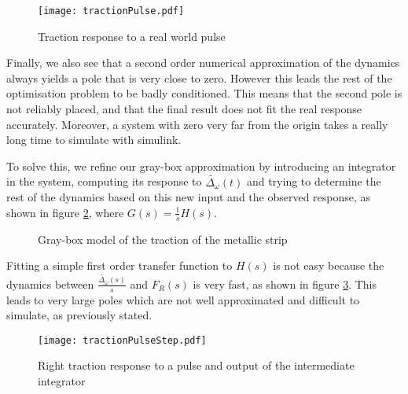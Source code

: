 \begin{figure}[htbp]
\centering
\texttt{[image: tractionPulse.pdf]}
\caption{Traction response to a real world pulse\label{fig:tracImpulseResponse}}
\end{figure}

Finally, we also see that a second order numerical approximation of the dynamics always yields a pole that is very close to zero. However this leads the rest of the optimisation problem to be badly conditioned. This means that the second pole is not reliably placed, and that the final result does not fit the real response accurately. Moreover, a system with zero very far from the origin takes a really long time to simulate with simulink.

To solve this, we refine our gray-box approximation by introducing an integrator in the system, computing its response to $\tilde{\Delta_\omega}(t)$ and trying to determine the rest of the dynamics based on this new input and the observed response, as shown in figure \ref{fig:tractionGrayBox}, where $G(s) = \frac{1}{s}H(s)$.
\begin{figure}[htbp]
\centering
{}
\caption{\label{fig:tractionInput}Gray-box model of the traction of the metallic strip\label{fig:tractionGrayBox}}
\end{figure}

Fitting a simple first order transfer function to $H(s)$ is not easy because the dynamics between $\frac{\tilde{\Delta_\omega}(s)}{s}$ and $F_R(s)$ is very fast, as shown in figure \ref{fig:tractionPulseStep}. This leads to very large poles which are not well approximated and difficult to simulate, as previously stated.
\begin{figure}[htbp]
\centering
\texttt{[image: tractionPulseStep.pdf]}
\caption{Right traction response to a pulse and output of the intermediate integrator\label{fig:tractionPulseStep}}
\end{figure}

